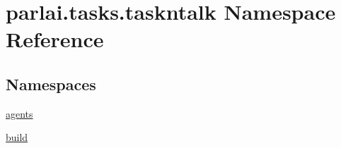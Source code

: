 \hypertarget{namespaceparlai_1_1tasks_1_1taskntalk}{}\section{parlai.\+tasks.\+taskntalk Namespace Reference}
\label{namespaceparlai_1_1tasks_1_1taskntalk}
\subsection*{Namespaces}
\begin{DoxyCompactItemize}
\item 
 \hyperlink{namespaceparlai_1_1tasks_1_1taskntalk_1_1agents}{agents}
\item 
 \hyperlink{namespaceparlai_1_1tasks_1_1taskntalk_1_1build}{build}
\end{DoxyCompactItemize}
